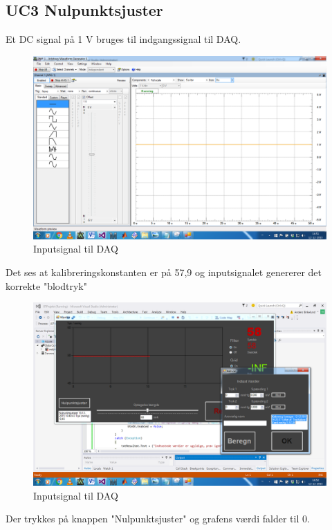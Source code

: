 \subsection{UC3 Nulpunktsjuster}

Et DC signal på 1 V bruges til indgangssignal til DAQ.
\begin{figure}[H]
	\centering
	\includegraphics[width=1\textwidth]{Figurer/Test_Nul_1}
	\caption{Inputsignal til DAQ}
\end{figure}

Det ses at kalibreringskonstanten er på 57,9 og inputsignalet genererer det korrekte "blodtryk"
\begin{figure}[H]
	\centering
	\includegraphics[width=1\textwidth]{Figurer/Test_Nul_2}
	\caption{Inputsignal til DAQ}
\end{figure}

Der trykkes på knappen "Nulpunktsjuster" og grafens værdi falder til 0. 

